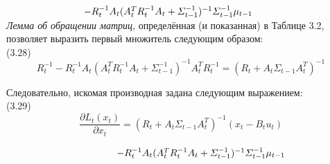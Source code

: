 \documentclass[10pt,a4paper]{article}
\begin{document}
$\hspace{28mm}-R_t^{-1}A_t(A_t^TR_t^{-1}A_t+\varSigma_{t-1}^{-1})^{-1}\varSigma_{t-1}^{-1}\mu_{t-1}$\\

\textit{Лемма об обращении матриц}, определённая (и показанная) в Таблице 3.2, позволяет выразить первый множитель следующим образом:\\

(3.28)
$$R_t^{-1}-R_t^{-1}A_t(A_t^TR_t^{-1}A_t+\varSigma_{t-1}^{-1})^{-1}A_t^T R_t^{-1}=(R_t+A_t\varSigma_{t-1}A_t^T)^{-1}$$

Следовательно, искомая производная задана следующим выражением:\\

(3.29)
$$\frac{\partial L_t(x_t)}{\partial x_t}=(R_t+A_t\varSigma_{t-1}A_t^T)^{-1}(x_t-B_t u_t)$$

$\hspace{40mm}-R_t^{-1}A_t(A_t^TR_t^{-1}A_t+\varSigma_{t-1}^{-1})^{-1}\varSigma_{t-1}^{-1}\mu_{t-1}$\\
\end{document}
